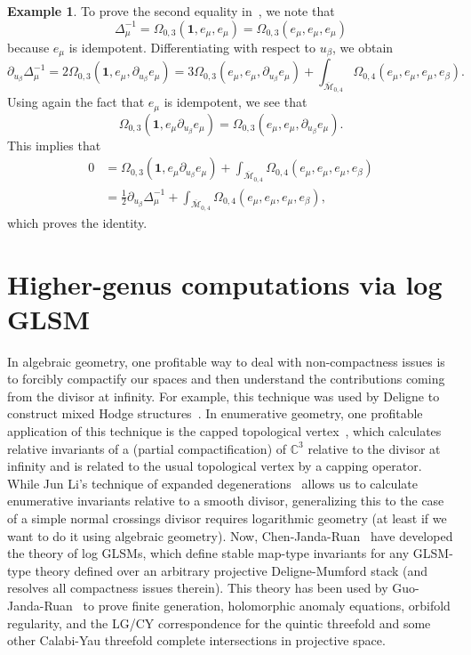 \documentclass[10pt,oldfontcommands,oneside]{memoir}
\theoremstyle{definition}
\newtheorem{exm}[thm]{Example}
\theoremstyle{remark}
\theoremstyle{plain}
\theoremstyle{definition}
\theoremstyle{remark}
\newcommand{\C}{\mathbb{C}}
\newcommand{\Mbar}{\overline{\mathcal{M}}}
\newcommand{\1}{\mathbf{1}}
\newcommand{\2}{\mathbf{2}}
\newcommand{\3}{\mathbf{3}}
\begin{document}
\begin{exm}
To prove the second equality in~, we note that
\[ \Delta_{\mu}^{-1} = \Omega_{0,3}(\1, e_{\mu}, e_{\mu}) = \Omega_{0,3}(e_{\mu}, e_{\mu}, e_{\mu}) \]
because $e_{\mu}$ is idempotent. Differentiating with respect to $u_{\beta}$, we obtain
\[ \partial_{u_{\beta}} \Delta_{\mu}^{-1} = 2 \Omega_{0,3}(\1,e_{\mu}, \partial_{u_{\beta}} e_{\mu}) = 3 \Omega_{0,3}(e_{\mu}, e_{\mu}, \partial_{u_{\beta}}e_{\mu}) + \int_{\Mbar_{0,4}}\Omega_{0,4}(e_{\mu}, e_{\mu}, e_{\mu}, e_{\beta}). \]
Using again the fact that $e_{\mu}$ is idempotent, we see that 
\[ \Omega_{0,3}(\1, e_{\mu} \partial_{u_{\beta}} e_{\mu}) = \Omega_{0,3}(e_{\mu}, e_{\mu}, \partial_{u_{\beta}}e_{\mu}). \]
This implies that
\begin{align*}
    0 &= \Omega_{0,3}(\1, e_{\mu} \partial_{u_{\beta}} e_{\mu}) + \int_{\Mbar_{0,4}} \Omega_{0,4}(e_{\mu}, e_{\mu}, e_{\mu}, e_{\beta}) \\
    &= \frac{1}{2} \partial_{u_{\beta}} \Delta_{\mu}^{-1} + \int_{\Mbar_{0,4}} \Omega_{0,4}(e_{\mu}, e_{\mu}, e_{\mu}, e_{\beta}), 
\end{align*}
which proves the identity.
\end{exm}

\chapter{Higher-genus computations via log GLSM}\thispagestyle{firstpage}
\label{pt:logglsm}

In algebraic geometry, one profitable way to deal with non-compactness issues is to forcibly compactify our spaces and then understand the contributions coming from the divisor at infinity. For example, this technique was used by Deligne to construct mixed Hodge structures~\cite{ht2}. In enumerative geometry, one profitable application of this technique is the capped topological vertex~\cite{dtloccurve}, which calculates relative invariants of a (partial compactification) of $\C^3$ relative to the divisor at infinity and is related to the usual topological vertex by a capping operator. While Jun Li's technique of expanded degenerations~\cite{expdeg} allows us to calculate enumerative invariants relative to a smooth divisor, generalizing this to the case of a simple normal crossings divisor requires logarithmic geometry (at least if we want to do it using algebraic geometry). Now, Chen-Janda-Ruan~\cite{logglsm} have developed the theory of log GLSMs, which define stable map-type invariants for any GLSM-type theory defined over an arbitrary projective Deligne-Mumford stack (and resolves all compactness issues therein). This theory has been used by Guo-Janda-Ruan~\cite{bcovlogglsm} to prove finite generation, holomorphic anomaly equations, orbifold regularity, and the LG/CY correspondence for the quintic threefold and some other Calabi-Yau threefold complete intersections in projective space.
\end{document}
